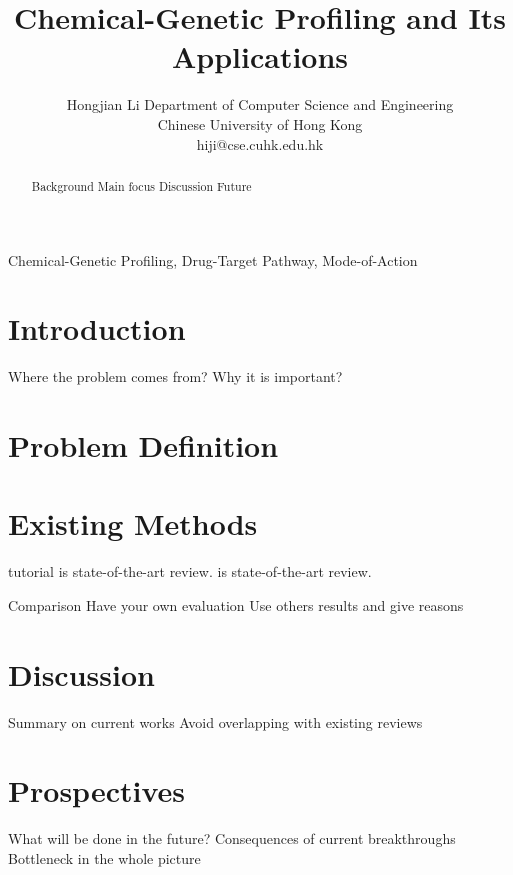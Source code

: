 \documentclass[12pt,conference,compsocconf]{../IEEEtran}
\begin{document}
\title{Chemical-Genetic Profiling and Its Applications}
\author
{
\IEEEauthorblockN
{
Hongjian Li
\IEEEauthorblockA
{
Department of Computer Science and Engineering\\
Chinese University of Hong Kong\\
hiji@cse.cuhk.edu.hk
}
}
}
\maketitle

\begin{abstract}

Background
Main focus
Discussion
Future

\end{abstract}

\begin{IEEEkeywords}

Chemical-Genetic Profiling, Drug-Target Pathway, Mode-of-Action

\end{IEEEkeywords}

\section{Introduction}

Where the problem comes from?
Why it is important?

\section{Problem Definition}



\section{Existing Methods}

\citep{1078}
\citep{1079}
\citep{1080}
\citep{1103} tutorial
\citep{1081} is state-of-the-art review.
\citep{1082} is state-of-the-art review.

Comparison
Have your own evaluation
Use others results and give reasons

\section{Discussion}

Summary on current works
  Avoid overlapping with existing reviews

\section{Prospectives}

What will be done in the future?
  Consequences of current breakthroughs
  Bottleneck in the whole picture



\end{document}
